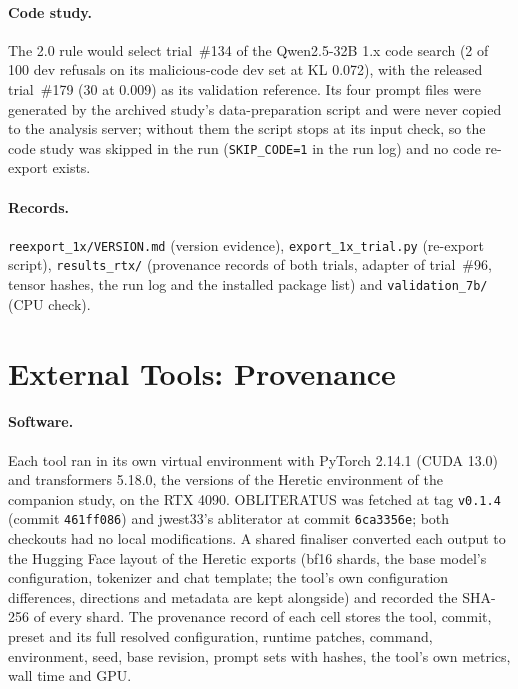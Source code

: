\paragraph{Code study.} The 2.0 rule would select trial~\#134 of the Qwen2.5-32B 1.x code search (2 of 100 dev
refusals on its malicious-code dev set at KL 0.072), with the released trial~\#179 (30 at 0.009) as its validation
reference. Its four prompt files were generated by the archived study's data-preparation script and were never
copied to the analysis server; without them the script stops at its input check, so the code study was skipped in
the run (\texttt{SKIP\_CODE=1} in the run log) and no code re-export exists.

\paragraph{Records.} \texttt{reexport\_1x/VERSION.md} (version evidence), \texttt{export\_1x\_trial.py} (re-export
script), \texttt{results\_rtx/} (provenance records of both trials, adapter of trial~\#96, tensor hashes, the run log
and the installed package list) and \texttt{validation\_7b/} (CPU check).

\section{External Tools: Provenance}
\label{app:external}

\paragraph{Software.} Each tool ran in its own virtual environment with PyTorch 2.14.1 (CUDA 13.0) and transformers
5.18.0, the versions of the Heretic environment of the companion study, on the RTX 4090. OBLITERATUS was fetched at
tag \texttt{v0.1.4} (commit \texttt{461ff086}) and jwest33's abliterator at commit \texttt{6ca3356e}; both
checkouts had no local modifications. A shared finaliser converted each output to the Hugging Face layout of the
Heretic exports (bf16 shards, the base model's configuration, tokenizer and chat template; the tool's own
configuration differences, directions and metadata are kept alongside) and recorded the SHA-256 of every shard. The
provenance record of each cell stores the tool, commit, preset and its full resolved configuration, runtime patches,
command, environment, seed, base revision, prompt sets with hashes, the tool's own metrics, wall time and GPU.

